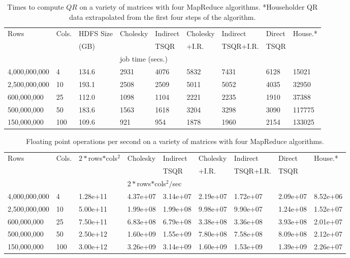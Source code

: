 \documentclass[10pt, conference, compsocconf]{IEEEtran}
\begin{document}
\begin{table*}[tbp]
\vspace{-\baselineskip}
\caption{Times to compute $QR$ on a variety of matrices with four MapReduce algorithms.  *Householder QR data extrapolated from the first four steps of the algorithm.}
\centering
\begin{tabularx}{\linewidth}{llXXXXXXX}
\toprule
Rows & Cols. & HDFS Size & Cholesky & Indirect & Cholesky & Indirect       & Direct & House.*\\
           &           & (GB)             &                   & TSQR    & +I.R.         & TSQR+I.R. & TSQR & \\ \cmidrule{4-9}
& & & \multicolumn{2}{l}{job time (secs.)} \\ \midrule
4,000,000,000 & 4     & 134.6 & 2931 & 4076  & 5832  & 7431 & 6128 & 15021\\
2,500,000,000 & 10   & 193.1 & 2508 & 2509  & 5011  & 5052 & 4035 & 32950 \\
600,000,000    & 25   & 112.0 & 1098 & 1104  & 2221  & 2235 & 1910 & 37388 \\
500,000,000    & 50   & 183.6 & 1563 & 1618  & 3204  & 3298 & 3090 & 117775\\
150,000,000    & 100 & 109.6 & 921   & 954    & 1878  & 1960 & 2154 & 133025\\
\bottomrule
\end{tabularx}
\label{tab:raw_performance}
\end{table*}

\begin{table*}[tbp]
\vspace{-\baselineskip}
\centering
\caption{Floating point operations per second on a variety of matrices with four MapReduce algorithms.}
\begin{tabularx}{\linewidth}{llXXXXXXX}
\toprule
Rows & Cols. & $2*$rows$*$cols$^2$ & Cholesky & Indirect & Cholesky & Indirect       & Direct & House.*\\
           &           &                                                  &                   & TSQR    & +I.R.         & TSQR+I.R. & TSQR & \\ \cmidrule{4-9}
& & & \multicolumn{2}{l}{$2*$rows$*$cols$^2/$sec} \\ \midrule
4,000,000,000 & 4     & 1.28e+11 &  4.37e+07 &   3.14e+07 & 2.19e+07 &  1.72e+07  & 2.09e+07 &  8.52e+06\\
2,500,000,000 & 10   & 5.00e+11 &  1.99e+08 &  1.99e+08  & 9.98e+07  & 9.90e+07   & 1.24e+08 & 1.52e+07\\
600,000,000    & 25   & 7.50e+11 &  6.83e+08 &  6.79e+08  & 3.38e+08  & 3.36e+08   & 3.93e+08 & 2.01e+07\\
500,000,000    & 50   & 2.50e+12 &  1.60e+09 &  1.55e+09  & 7.80e+08  & 7.58e+08   & 8.09e+08 & 2.12e+07\\
150,000,000    & 100 & 3.00e+12 &  3.26e+09 &  3.14e+09  & 1.60e+09  & 1.53e+09  & 1.39e+09 & 2.26e+07\\
\bottomrule
\end{tabularx}
\label{tab:work_performance}
\end{table*}
\end{document}
